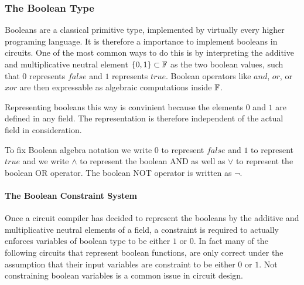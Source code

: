 \subsubsection{The Boolean Type} 
Booleans are a classical primitive type, implemented by virtually every higher programing language. It is therefore a importance to implement booleans in circuits. One of the most common ways to do this is by interpreting the additive and multiplicative neutral element $\{0,1\}\subset \mathbb{F}$ as the two boolean values, such that $0$ represents $false$ and $1$ represents $true$. Boolean operators like $and$, $or$, or $xor$ are then expressable as algebraic computations inside $\mathbb{F}$. 

Representing booleans this way is convinient because the elements $0$ and $1$ are defined in any field. The representation is therefore independent of the actual field in consideration. 

To fix Boolean algebra notation we write $0$ to represent $false$ and $1$ to represent $true$ and we write $\wedge$ to represent the boolean AND as well as $\vee$ to represent the boolean OR operator. The boolean NOT operator is written as $\lnot$. 
\paragraph{The Boolean Constraint System} Once a circuit compiler has decided to represent the booleans by the additive and multiplicative neutral elements of a field, a constraint is required to actually enforces variables of boolean type to be either $1$ or $0$. In fact many of the following circuits that represent boolean functions, are only correct under the assumption that their input variables are constraint to be either $0$ or $1$. Not constraining boolean variables is a common issue in circuit design.

